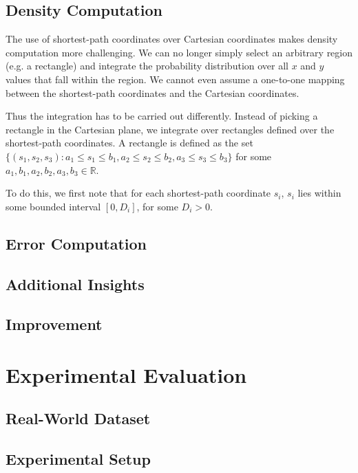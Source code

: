 \documentclass[letterpaper]{article}
\begin{document}
\subsection{Density Computation}

The use of shortest-path coordinates over Cartesian coordinates makes density computation more challenging. We can no longer simply select an arbitrary region (e.g. a rectangle) and integrate the probability distribution over all $x$ and $y$ values that fall within the region. We cannot even assume a one-to-one mapping between the shortest-path coordinates and the Cartesian coordinates.

Thus the integration has to be carried out differently. Instead of picking a rectangle in the Cartesian plane, we integrate over rectangles defined over the shortest-path coordinates. A rectangle is defined as the set $\{(s_1,s_2,s_3) : a_1\leq s_1\leq b_1, a_2\leq s_2\leq b_2, a_3\leq s_3\leq b_3\}$ for some $a_1,b_1,a_2,b_2,a_3,b_3 \in \mathbb{R}$.

To do this, we first note that for each shortest-path coordinate $s_i$, $s_i$ lies within some bounded interval $[0,D_i]$, for some $D_i > 0$.



\subsection{Error Computation}


\subsection{Additional Insights}


\subsection{Improvement}



\section{Experimental Evaluation}



\subsection{Real-World Dataset}



\subsection{Experimental Setup}
\end{document}
